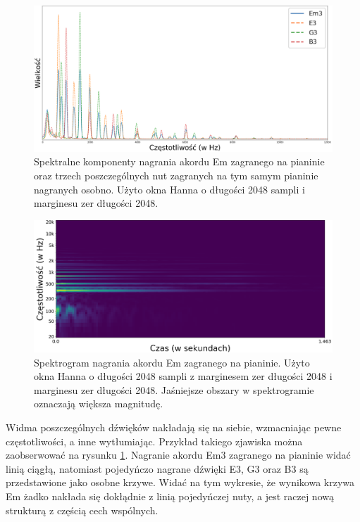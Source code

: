\documentclass[12pt,a4paper,twoside]{mwart}
\begin{document}
\begin{figure}[H]
  \begin{center}
    \includegraphics[scale=0.325]{images/Em/spectral_component_em3_partials_2048_512_cropped.png}
    \caption{Spektralne komponenty nagrania akordu Em zagranego na pianinie oraz trzech poszczególnych nut zagranych na tym samym pianinie nagranych osobno. Użyto okna Hanna o długości 2048 sampli i marginesu zer długości 2048.}
    \label{fig:multi:spectra:partials}
  \end{center}
\end{figure}

\begin{figure}[H]
  \begin{center}
    \includegraphics[scale=0.27]{images/Em/spectrogram_Em_2048_512_cropped.png}
    \caption{Spektrogram nagrania akordu Em zagranego na pianinie. Użyto okna Hanna o długości 2048 sampli z marginesem zer długości 2048 i marginesu zer długości 2048. Jaśniejsze obszary w spektrogramie oznaczają większa magnitudę.}
    \label{fig:multi:em:spectrogram}
  \end{center}
\end{figure}

Widma poszczególnych dźwięków nakładają się na siebie, wzmacniając pewne częstotliwości, a inne wytłumiając. Przykład takiego zjawiska można zaobserwować na rysunku \ref{fig:multi:spectra:partials}. Nagranie akordu Em3 zagranego na pianinie widać linią ciągłą, natomiast pojedyńczo nagrane dźwięki E3, G3 oraz B3 są przedstawione jako osobne krzywe. Widać na tym wykresie, że wynikowa krzywa Em żadko nakłada się dokłądnie z linią pojedyńczej nuty, a jest raczej nową strukturą z częścią cech wspólnych.
\end{document}
